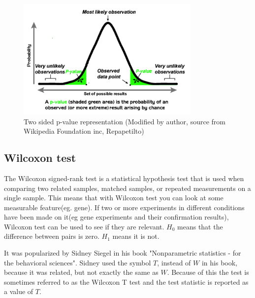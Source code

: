 \documentclass[12pt]{article}
\begin{document}
\begin{figure}[!ht]
  \centering
  \includegraphics[width=0.8\textwidth]{p_value_two_sided}
  \caption{Two sided p-value representation (Modified by author, source from Wikipedia Foundation inc, Repapetilto)}
  \label{fig:p_value_two_sided}
\end{figure}

\newpage
\subsection{Wilcoxon test}

The Wilcoxon signed-rank test is a statistical hypothesis test that is used when comparing two related samples, matched samples, or repeated measurements on a single sample. This means that with Wilcoxon test you can look at some measurable feature(eg. gene). If two or more experiments in different conditions have been made on it(eg gene experiments and their confirmation results), Wilcoxon test can be used to see if they are relevant. $H_0$ means that the difference between pairs is zero. $H_1$ means it is not.

It was popularized by Sidney Siegel in his book "Nonparametric statistics - for the behavioral sciences". Sidney used the symbol $T$, instead of $W$ in his book, because it was related, but not exactly the same as $W$. Because of this the test is sometimes referred to as the Wilcoxon T test and the test statistic is reported as a value of $T$.
\end{document}
